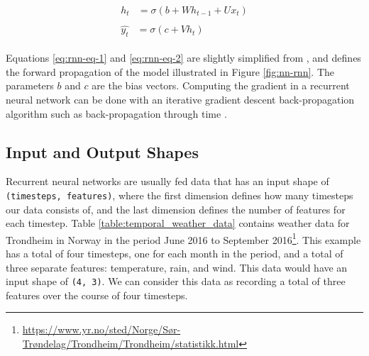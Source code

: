 \begin{align}[h]
    \begin{split}\label{eq:rnn-eq-1}
        h_{t}&=\sigma(b+Wh_{t-1}+Ux_{t})
    \end{split}\\
    \begin{split}\label{eq:rnn-eq-2}
        \hat{y_{t}}&=\sigma(c+Vh_{t})
    \end{split}
\end{align}

Equations \ref{eq:rnn-eq-1} and \ref{eq:rnn-eq-2} are slightly simplified from \cite{goodfellow2016deeplearning}, and defines the forward propagation of the model illustrated in Figure \ref{fig:nn-rnn}. The parameters \(b\) and \(c\) are the bias vectors. Computing the gradient in a recurrent neural network can be done with an iterative gradient descent back-propagation algorithm such as back-propagation through time \citep{werbos1990backpropagation, rumelhart1988learning}. 

\subsection{Input and Output Shapes}
\label{sec:input_and_output_shapes}
Recurrent neural networks are usually fed data that has an input shape of {\tt (timesteps, features)}, where the first dimension defines how many timesteps our data consists of, and the last dimension defines the number of features for each timestep. Table \ref{table:temporal_weather_data} contains weather data for Trondheim in Norway in the period June 2016 to September 2016\footnote{\url{https://www.yr.no/sted/Norge/Sør-Trøndelag/Trondheim/Trondheim/statistikk.html}}. This example has a total of four timesteps, one for each month in the period, and a total of three separate features: temperature, rain, and wind. This data would have an input shape of {\tt (4, 3)}. We can consider this data as recording a total of three features over the course of four timesteps.

